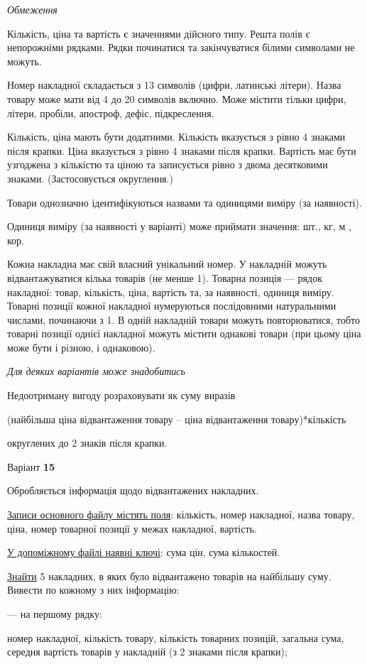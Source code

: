 \documentclass[11pt, ukrainian]{article}
\begin{document}
\bigskip\textit{Обмеження}

Кількість, ціна та вартість є значеннями дійсного типу.
Решта полів є непорожніми рядками.
Рядки починатися та закінчуватися білими символами не можуть.

Номер накладної складається з 13 символів (цифри, латинські літери).
Назва товару може мати від 4 до 20 символів включно.
Може містити тільки цифри, літери, пробіли, апостроф, дефіс, підкреслення.

Кількість, ціна мають бути додатними.
Кількість вказується з рівно 4 знаками після крапки.
Ціна вказується з рівно 4 знаками після крапки.
Вартість має бути узгоджена з кількістю та ціною та записується рівно з двома десятковими знаками.
(Застосовується округлення.)

Товари однозначно ідентифікуються назвами та одиницями виміру (за наявності).

Одиниця виміру (за наявності у варіанті) може приймати значення: шт., кг, м , кор.

Кожна накладна має свій власний унікальний номер.
У накладній можуть відвантажуватися кілька товарів (не менше 1).
Товарна позиція --- рядок накладної: товар, кількість, ціна, вартість та, за наявності, одиниця виміру.
Товарні позиції кожної накладної нумеруються послідовними натуральними числами, починаючи з 1.
В одній накладній товари можуть повторюватися, 
тобто товарні позиції однієї накладної можуть містити однакові товари 
(при цьому ціна може бути і різною, і однаковою).

\bigskip\textit{Для деяких варіантів може знадобитись}

Недоотриману вигоду розраховувати як суму виразів
{\center (найбільша ціна відвантаження товару – ціна відвантаження товару)*кількість\par}

\bigskip
{\noindent} округлених до 2 знаків після крапки.


\par
\newpage
{\center Варіант  \No \textbf { 15 }\par}
\bigskip
Обробляється інформація щодо відвантажених накладних.

\underline{Записи основного файлу містять поля}: кількість, номер накладної, назва товару, ціна, номер товарної позиції у межах накладної, вартість.

\underline{У допоміжному файлі наявні ключі}: сума цін, сума кількостей.

\underline{Знайти} 5 накладних, в яких було відвантажено товарів на найбільшу суму. Вивести по кожному з них інформацію:\par
{\noindent}--- на першому рядку:\par
номер накладної, кількість товару, кількість товарних позицій, загальна сума, середня вартість товарів у накладній (з 2 знаками після крапки);
\end{document}

